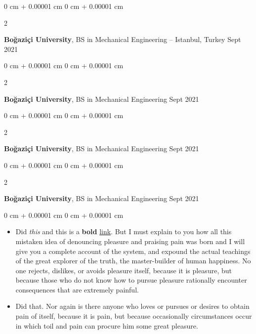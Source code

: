 \documentclass[10pt, letterpaper]{article}
\newenvironment{highlights}{
    \begin{itemize}[
        topsep=0.10 cm,
        parsep=0.10 cm,
        partopsep=0pt,
        itemsep=0pt,
        leftmargin=0 cm + 10pt
    ]
}{
    \end{itemize}
} %
\newenvironment{onecolentry}{
    \begin{adjustwidth}{
        0 cm + 0.00001 cm
    }{
        0 cm + 0.00001 cm
    }
}{
    \end{adjustwidth}
} %
\newenvironment{twocolentry}[2][]{
    \onecolentry
    \def\secondColumn{#2}
    \setcolumnwidth{\fill, 4.5 cm}
    \begin{paracol}{2}
}{
    \switchcolumn \raggedleft \secondColumn
    \end{paracol}
    \endonecolentry
} %
\begin{document}
        \vspace{0.2 cm}

        \begin{twocolentry}{
            Sept 2021
        }
            \textbf{Boğaziçi University}, BS in Mechanical Engineering -- Istanbul, Turkey\end{twocolentry}



        \vspace{0.2 cm}

        \begin{twocolentry}{
            Sept 2021
        }
            \textbf{Boğaziçi University}, BS in Mechanical Engineering\end{twocolentry}



        \vspace{0.2 cm}

        \begin{twocolentry}{
            Sept 2021
        }
            \textbf{Boğaziçi University}, BS in Mechanical Engineering\end{twocolentry}



        \vspace{0.2 cm}

        \begin{twocolentry}{
            Sept 2021
        }
            \textbf{Boğaziçi University}, BS in Mechanical Engineering\end{twocolentry}

        \vspace{0.10 cm}
        \begin{onecolentry}
            \begin{highlights}
                \item Did \textit{this} and this is a \textbf{bold} \href{https://example.com}{link}. But I must explain to you how all this mistaken idea of denouncing pleasure and praising pain was born and I will give you a complete account of the system, and expound the actual teachings of the great explorer of the truth, the master-builder of human happiness. No one rejects, dislikes, or avoids pleasure itself, because it is pleasure, but because those who do not know how to pursue pleasure rationally encounter consequences that are extremely painful.
                \item Did that. Nor again is there anyone who loves or pursues or desires to obtain pain of itself, because it is pain, but because occasionally circumstances occur in which toil and pain can procure him some great pleasure.
            \end{highlights}
        \end{onecolentry}
\end{document}
